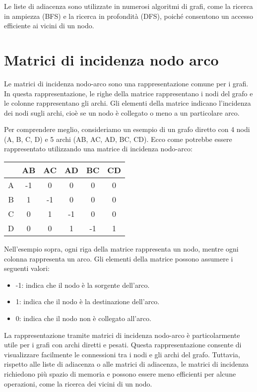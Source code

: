 Le liste di adiacenza sono utilizzate in numerosi algoritmi di grafi, come la ricerca in ampiezza (BFS) e la ricerca in profondità (DFS), poiché consentono un accesso efficiente ai vicini di un nodo.

\section{Matrici di incidenza nodo arco}
Le matrici di incidenza nodo-arco sono una rappresentazione comune per i grafi. In questa rappresentazione, le righe della matrice rappresentano i nodi del grafo e le colonne rappresentano gli archi. Gli elementi della matrice indicano l'incidenza dei nodi sugli archi, cioè se un nodo è collegato o meno a un particolare arco.

Per comprendere meglio, consideriamo un esempio di un grafo diretto con 4 nodi (A, B, C, D) e 5 archi (AB, AC, AD, BC, CD). Ecco come potrebbe essere rappresentato utilizzando una matrice di incidenza nodo-arco:

\begin{center}
\begin{tabular}{c|ccccc}
    & AB & AC & AD & BC & CD \\
\hline
A & -1 & 0 & 0 & 0 & 0 \\
B & 1 & -1 & 0 & 0 & 0 \\
C & 0 & 1 & -1 & 0 & 0 \\
D & 0 & 0 & 1 & -1 & 1 \\
\end{tabular}
\end{center}


Nell'esempio sopra, ogni riga della matrice rappresenta un nodo, mentre ogni colonna rappresenta un arco. Gli elementi della matrice possono assumere i seguenti valori:
\begin{itemize}
  
  \item -1: indica che il nodo è la sorgente dell'arco.
  \item 1: indica che il nodo è la destinazione dell'arco.
  \item 0: indica che il nodo non è collegato all'arco.
\end{itemize}

La rappresentazione tramite matrici di incidenza nodo-arco è particolarmente utile per i grafi con archi diretti e pesati. Questa rappresentazione consente di visualizzare facilmente le connessioni tra i nodi e gli archi del grafo. Tuttavia, rispetto alle liste di adiacenza o alle matrici di adiacenza, le matrici di incidenza richiedono più spazio di memoria e possono essere meno efficienti per alcune operazioni, come la ricerca dei vicini di un nodo.

